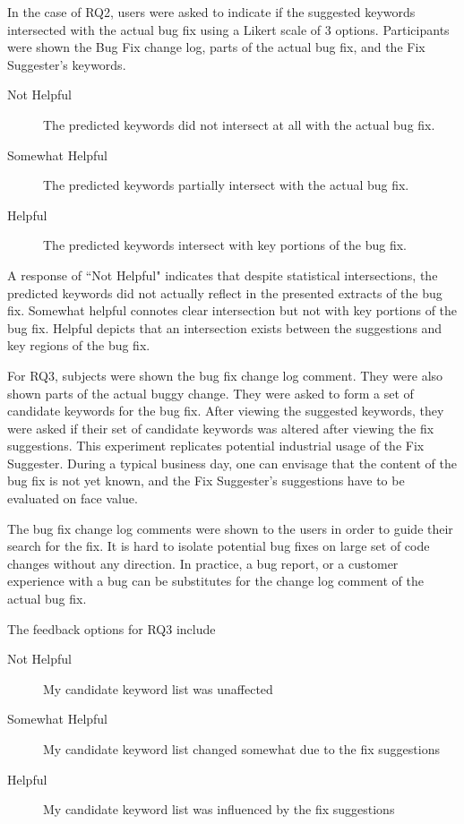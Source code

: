 \documentclass[conference]{IEEEtran}
\begin{document}
In the case of RQ2, users were asked to indicate if the suggested keywords intersected with the actual bug fix using a Likert scale of 3 options. Participants were shown the Bug Fix change log, parts of the actual bug fix, and the Fix Suggester's keywords.

\begin{description}
	\item[Not Helpful] The predicted keywords did not intersect at all with the actual bug fix.
	\item[Somewhat Helpful] The predicted keywords partially intersect with the actual bug fix.
	\item[Helpful] The predicted keywords intersect with key portions of the bug fix.
\end{description}

A response of ``Not Helpful" indicates that despite statistical intersections, the predicted keywords did not actually reflect in the presented extracts of the bug fix. Somewhat helpful connotes clear intersection but not with key portions of the bug fix. Helpful depicts that an intersection exists between the suggestions and key regions of the bug fix.

For RQ3, subjects were shown the bug fix change log comment. They were also shown parts of the actual buggy change. They were asked to form a set of candidate keywords for the bug fix. After viewing the suggested keywords, they were asked if their set of candidate keywords was altered after viewing the fix suggestions. This experiment replicates potential industrial usage of the Fix Suggester. During a typical business day, one can envisage that the content of the bug fix is not yet known, and the Fix Suggester's suggestions have to be evaluated on face value. 

The bug fix change log comments were shown to the users in order to guide their search for the fix. It is hard to isolate potential bug fixes on large set of code changes without any direction. In practice, a bug report, or a customer experience with a bug can be substitutes for the change log comment of the actual bug fix.

The feedback options for RQ3 include

\begin{description}
	\item[Not Helpful] My candidate keyword list was unaffected
	\item[Somewhat Helpful] My candidate keyword list changed somewhat due to the fix suggestions
	\item[Helpful] My candidate keyword list was influenced by the fix suggestions
\end{description}
\end{document}
